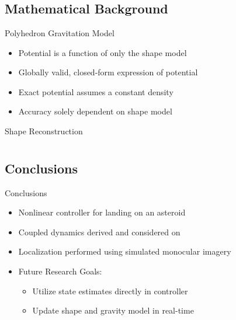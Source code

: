 \documentclass[11pt,professionalfonts]{beamer}
\begin{document}
\section*{}
\subsection*{Mathematical Background}
\begin{frame}{Polyhedron Gravitation Model}

\begin{itemize}
    \item Potential is a function of only the shape model
    \item Globally valid, closed-form expression of potential
    \item Exact potential assumes a constant density 
    \item Accuracy solely dependent on shape model
\end{itemize}

\end{frame}

\begin{frame}{Shape Reconstruction}

\end{frame}
\section*{}
\subsection*{Conclusions}

\begin{frame}{Conclusions}
    \begin{itemize}
        \item Nonlinear controller for landing on an asteroid
        \item Coupled dynamics derived and considered on \SE
        \item Localization performed using simulated monocular imagery
        \item Future Research Goals:
            \begin{itemize}
                \item Utilize state estimates directly in controller
                \item Update shape and gravity model in real-time
            \end{itemize}
    \end{itemize} 
\end{frame}
\end{document}
